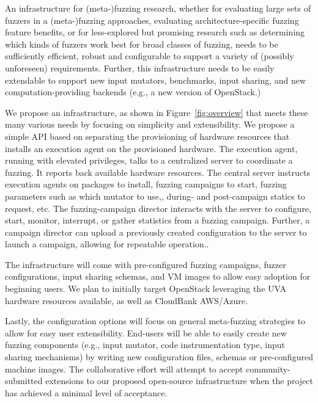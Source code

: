 
An infrastructure for (meta-)fuzzing research, 
whether for evaluating large sets of fuzzers in a (meta-)fuzzing approaches, 
evaluating architecture-specific fuzzing feature benefits, 
or for less-explored but promising research such as determining which kinds of 
fuzzers work best for broad classes of fuzzing, needs to be sufficiently 
efficient, robust and configurable to support a variety of (possibly 
unforeseen) requirements.  
Further, this infrastructure needs to be easily extendable to support new input 
mutators, benchmarks, input sharing, and new computation-providing backends 
(e.g., a new version of OpenStack.)

We propose an infrastructure, as shown in Figure~\ref{fig:overview} that meets these many various needs by focusing on 
simplicity and extensibility.  We propose a simple API based on separating the 
provisioning of hardware resources that installs an execution agent on the 
provisioned hardware.   The execution agent, running with elevated privileges, 
talks to a centralized server to coordinate a fuzzing.  It reports back 
available hardware resources.  The central server instructs execution agents on 
packages to install, fuzzing campaigns to start, fuzzing parameters such as 
which mutator to use,, during- and post-campaign statics to request, etc.  The 
fuzzing-campaign director interacts with the server to configure, start, 
monitor, interrupt, or gather statistics from a fuzzing campaign.  Further, a 
campaign director can upload a previously created configuration to the server 
to launch a campaign, allowing for repeatable operation..  

The infrastructure will come with pre-configured fuzzing campaigns, fuzzer 
configurations, input sharing schemas, and VM images to allow easy adoption for 
beginning users.  We plan to initially target OpenStack leveraging the UVA 
hardware resources available, as well as CloudBank AWS/Azure.

Lastly, the configuration options will focus on general meta-fuzzing strategies 
to allow for easy user extensibility.  End-users will be able to easily create 
new fuzzing components (e.g., input mutator, code instrumentation type, input 
sharing mechanisms) by writing new configuration files, schemas or 
pre-configured machine images.  The collaborative effort will attempt to accept 
community-submitted extensions to our proposed open-source infrastructure when 
the project has achieved a minimal level of acceptance.

